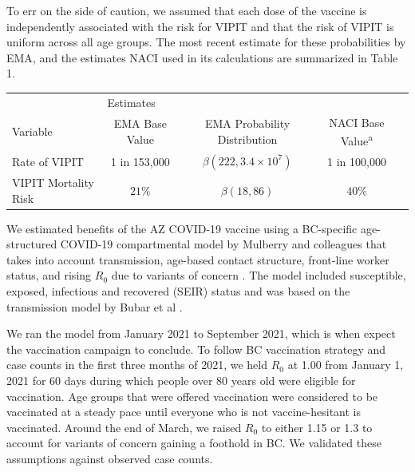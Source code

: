 \documentclass[]{interact}
\theoremstyle{plain}%
\theoremstyle{definition}
\theoremstyle{remark}
\begin{document}
To err on the side of caution, we assumed that each dose of the vaccine
is independently associated with the risk for VIPIT and that the risk of
VIPIT is uniform across all age groups. The most recent estimate for
these probabilities by EMA, and the estimates NACI used in its
calculations are summarized in Table 1.

\begin{table}
{\begin{tabular}{lcccc} \toprule
 & \multicolumn{2}{l}{Estimates} \\ \cmidrule{2-4}
 Variable & EMA Base Value & EMA Probability Distribution & NACI Base Value\textsuperscript{a}  \\ \midrule
 Rate of VIPIT & 1 in 153,000 & $\beta(222, 3.4\times 10^7)$ & 1 in 100,000 \\
 VIPIT Mortality Risk & $21\%$ &  $\beta(18, 86)$ & $40\%$ \\ \bottomrule
\end{tabular}}
\label{harm-param}
\end{table}

We estimated benefits of the AZ COVID-19 vaccine using a BC-specific
age-structured COVID-19 compartmental model by Mulberry and colleagues
that takes into account transmission, age-based contact structure,
front-line worker status, and rising \(R_0\) due to variants of concern
\citep{mulberry_vaccine_2021}. The model included susceptible, exposed,
infectious and recovered (SEIR) status and was based on the transmission
model by Bubar et al \citep{bubar_model-informed_2021}.

We ran the model from January 2021 to September 2021, which is when
expect the vaccination campaign to conclude. To follow BC vaccination
strategy and case counts in the first three months of 2021, we held
\(R_0\) at 1.00 from January 1, 2021 for 60 days during which people
over 80 years old were eligible for vaccination. Age groups that were
offered vaccination were considered to be vaccinated at a steady pace
until everyone who is not vaccine-hesitant is vaccinated. Around the end
of March, we raised \(R_0\) to either 1.15 or 1.3 to account for
variants of concern gaining a foothold in BC. We validated these
assumptions against observed case counts.
\end{document}
